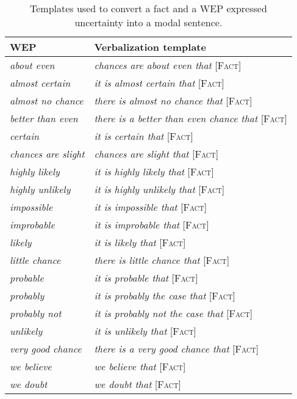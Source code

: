 \documentclass[11pt]{article}
\begin{document}
\begin{table}[H]
\centering
\begin{tabular}{ll}
\toprule
                        WEP &                                                         Verbalization template \\
\midrule
        \textit{about even} &             \textit{chances are about even that} [\textsc{Fact}] \\
    \textit{almost certain} &               \textit{it is almost certain that} [\textsc{Fact}] \\
  \textit{almost no chance} &          \textit{there is almost no chance that} [\textsc{Fact}] \\
  \textit{better than even} & \textit{there is a better than even chance that} [\textsc{Fact}] \\
           \textit{certain} &                      \textit{it is certain that} [\textsc{Fact}] \\
\textit{chances are slight} &                 \textit{chances are slight that} [\textsc{Fact}] \\
     \textit{highly likely} &                \textit{it is highly likely that} [\textsc{Fact}] \\
   \textit{highly unlikely} &              \textit{it is highly unlikely that} [\textsc{Fact}] \\
        \textit{impossible} &                   \textit{it is impossible that} [\textsc{Fact}] \\
        \textit{improbable} &                   \textit{it is improbable that} [\textsc{Fact}] \\
            \textit{likely} &                       \textit{it is likely that} [\textsc{Fact}] \\
     \textit{little chance} &             \textit{there is little chance that} [\textsc{Fact}] \\
          \textit{probable} &                     \textit{it is probable that} [\textsc{Fact}] \\
          \textit{probably} &            \textit{it is probably the case that} [\textsc{Fact}] \\
      \textit{probably not} &        \textit{it is probably not the case that} [\textsc{Fact}] \\
          \textit{unlikely} &                     \textit{it is unlikely that} [\textsc{Fact}] \\
  \textit{very good chance} &        \textit{there is a very good chance that} [\textsc{Fact}] \\
        \textit{we believe} &                         \textit{we believe that} [\textsc{Fact}] \\
          \textit{we doubt} &                           \textit{we doubt that} [\textsc{Fact}] \\
\bottomrule
\end{tabular}
\caption{Templates used to convert a fact and a WEP expressed uncertainty into a modal sentence. \label{tab:templates}}
\end{table}
\end{document}
